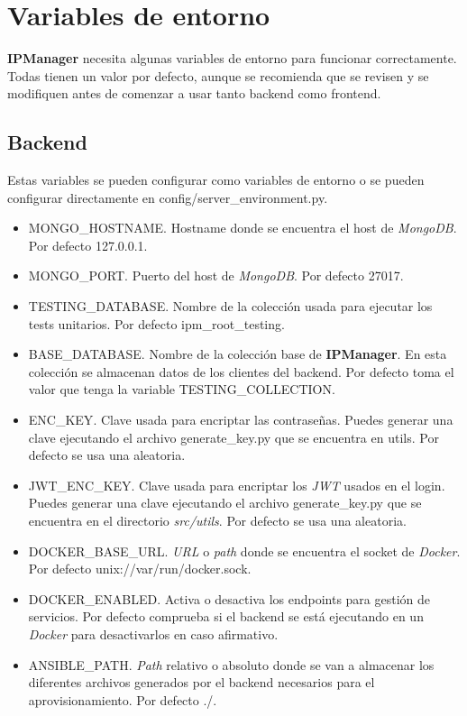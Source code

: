 \chapter{Variables de entorno}
\label{sec:variables}

\textbf{IPManager} necesita algunas variables de entorno para funcionar correctamente. Todas tienen un valor por defecto, aunque se recomienda que se revisen y se modifiquen antes de comenzar a usar tanto backend como frontend.

\section{Backend}

Estas variables se pueden configurar como variables de entorno o se pueden configurar directamente en \textsf{config/server\_environment.py}.

\begin{itemize}
	\item \textsf{MONGO\_HOSTNAME}. Hostname donde se encuentra el host de \textit{MongoDB}. Por defecto \textsf{127.0.0.1}.
	\item \textsf{MONGO\_PORT}. Puerto del host de \textit{MongoDB}. Por defecto \textsf{27017}.
	\item \textsf{TESTING\_DATABASE}. Nombre de la colección usada para ejecutar los tests unitarios. Por defecto \textsf{ipm\_root\_testing}.
	\item \textsf{BASE\_DATABASE}. Nombre de la colección base de \textbf{IPManager}. En esta colección se almacenan datos de los clientes del backend. Por defecto toma el valor que tenga la variable \textsf{TESTING\_COLLECTION}.
	\item \textsf{ENC\_KEY}. Clave usada para encriptar las contraseñas. Puedes generar una clave ejecutando el archivo \textsf{generate\_key.py} que se encuentra en \textsf{utils}. Por defecto se usa una aleatoria.
	\item \textsf{JWT\_ENC\_KEY}. Clave usada para encriptar los \textit{JWT} usados en el login. Puedes generar una clave ejecutando el archivo \textsf{generate\_key.py} que se encuentra en el directorio \textit{src/utils}. Por defecto se usa una aleatoria.
	\item \textsf{DOCKER\_BASE\_URL}. \textit{URL} o \textit{path} donde se encuentra el socket de \textit{Docker}. Por defecto \textsf{unix://var/run/docker.sock}.
	\item \textsf{DOCKER\_ENABLED}. Activa o desactiva los endpoints para gestión de servicios. Por defecto comprueba si el backend se está ejecutando en un \textit{Docker} para desactivarlos en caso afirmativo.
	\item \textsf{ANSIBLE\_PATH}. \textit{Path} relativo o absoluto donde se van a almacenar los diferentes archivos generados por el backend necesarios para el aprovisionamiento. Por defecto \textsf{./}.
\end{itemize}


